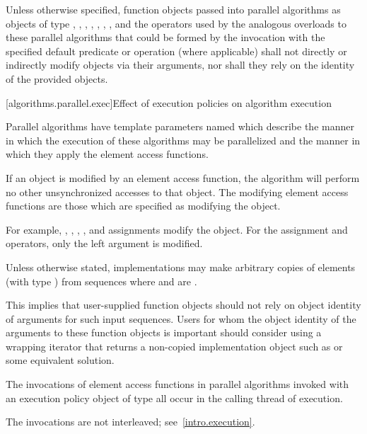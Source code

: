 \pnum
Unless otherwise specified, function objects passed into parallel algorithms as
objects of type , , ,
, , ,
, and the operators used by the analogous overloads to
these parallel algorithms that could be formed by the invocation with the
specified default predicate or operation (where applicable) shall not directly
or indirectly modify objects via their arguments, nor shall they rely on the
identity of the provided objects.

[algorithms.parallel.exec]{Effect of execution policies on algorithm execution}

\pnum
Parallel algorithms have template parameters
named 
which describe the manner in which the execution of these algorithms may be
parallelized and the manner in which they apply the element access functions.

\pnum
If an object is modified by an element access function,
the algorithm will perform no other unsynchronized accesses to that object.
The modifying element access functions are those
which are specified as modifying the object.
\begin{note}
For example,
, \tcode{++}, \tcode{--}, , and assignments
modify the object.
For the assignment and  operators,
only the left argument is modified.
\end{note}

\pnum
Unless otherwise stated, implementations may make arbitrary copies of elements
(with type ) from sequences where 
and  are .
\begin{note}
This implies that user-supplied function objects should not rely on object
identity of arguments for such input sequences. Users for whom the object
identity of the arguments to these function objects is important should
consider using a wrapping iterator that returns a non-copied implementation
object such as  or some equivalent
solution.
\end{note}

\pnum
The invocations of element access functions in parallel algorithms invoked with
an execution policy object of type  all occur
in the calling thread of execution.
\begin{note}
The invocations are not interleaved; see~\ref{intro.execution}.
\end{note}

